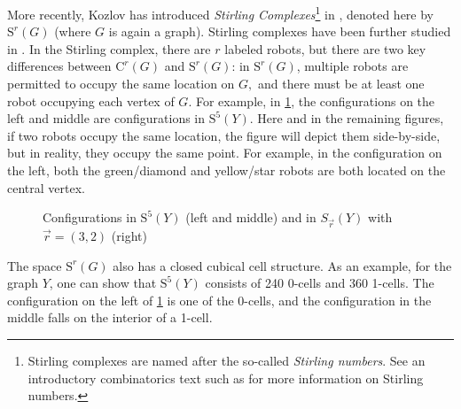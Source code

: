 \documentclass{amsart}
\newcommand{\Sr}{S_{\vec{r}}}
\newcommand{\C}{\mathrm{C}}
\newcommand{\St}{\mathrm{S}}
\newcommand{\vertex}[3][1]{
\node [circle,  fill, inner sep = 0pt,outer sep = 0pt, minimum size=#1mm] (#3) at #2 {};
}
\newcommand{\fg}[1]{
    \pgfdeclarelayer{foreground}
    \pgfsetlayers{main,foreground}
    \begin{pgfonlayer}{foreground}
    #1
    \end{pgfonlayer}
    }
\newcommand{\Ygraph}{
    \fg{\vertex{(0,0)}{B}
    \vertex{(0,-1)}{A}
    \vertex{(-.707,.707)}{C}
    \vertex{(.707,.707)}{D}
    \draw (A) -- (B) -- (C) -- (B) -- (D);
    }
}
\newcommand{\RedRobot}[2]{
\node [rectangle, cbred, fill, inner sep = 0pt,outer sep = 1pt, minimum size=2.3mm] (#2) at #1 {};
}
\newcommand{\GreenRobot}[2]{
\node [diamond, cbgreen, fill, inner sep = 0pt,outer sep = 1pt,minimum size=3mm] (#2) at #1 {};
}
\newcommand{\BlueRobot}[2]{
\node [isosceles triangle, shape border rotate=90,cbblue, fill, inner sep = 0pt,outer sep = 1pt,minimum size=2.5mm] (#2) at #1 {};
}
\newcommand{\YellowRobot}[2]{
\node [star, cbyellow, fill, inner sep = 0pt,outer sep = 1pt,minimum size=3.2mm] (#2) at #1 {};
}
\newcommand{\PurpleRobot}[2]{
\node [circle, Purple, fill, inner sep = 0pt,outer sep = 1pt,minimum size=2.7mm] (#2) at #1 {};
}
\theoremstyle{definition}
\theoremstyle{remark}
\begin{document}
More recently, Kozlov has introduced \textit{Stirling Complexes}\footnote{Stirling complexes are named after the so-called \textit{Stirling numbers}. See an introductory combinatorics text such as \cite{Bona_2016} for more information on Stirling numbers.} in \cite{Kozlov_2023}, denoted here by $\St^r(G)$ (where $G$ is again a graph). Stirling complexes have been further studied in \cite{Kozlov_2022b,Hoekstra-Mendoza_2024}. In the Stirling complex, there are $r$ labeled robots, but there are two key differences between $\C^r(G)$ and $\St^r(G)$: in $\St^r(G)$, multiple robots are permitted to occupy the same location on $G,$ and there must be at least one robot occupying each vertex of $G.$ For example, in \cref{fig:StirlingConfigs}, the configurations on the left and middle are configurations in $\St^5(Y).$ Here and in the remaining figures, if two robots occupy the same location, the figure will depict them side-by-side, but in reality, they occupy the same point. For example, in the configuration on the left, both the green/diamond and yellow/star robots are both located on the central vertex.

\begin{figure}[h!]
    \centering
    \hspace{1cm}
    \hspace{1cm}
    \caption{Configurations in $\St^5(Y)$ (left and middle) and in $\Sr(Y)$ with $\vec{r}=(3,2)$ (right)}
    \label{fig:StirlingConfigs}
\end{figure}

The space $\St^r(G)$ also has a closed cubical cell structure. As an example, for the graph $Y$, one can show that $\St^5(Y)$ consists of 240 0-cells and 360 1-cells. The configuration on the left of \cref{fig:StirlingConfigs} is one of the 0-cells, and the configuration in the middle falls on the interior of a 1-cell.
\end{document}
